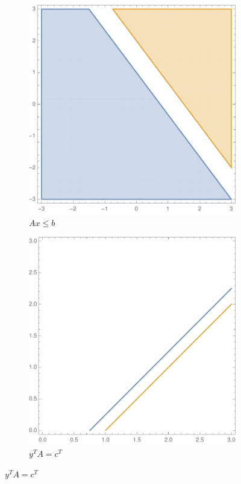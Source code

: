 \documentclass[10pt]{article}
\begin{document}
\begin{solution}
\begin{figure}[ht]\centering
    \begin{subfigure}{.4\textwidth}\centering
        \includegraphics[width=\textwidth]{img/Axb.pdf}
        \caption{ \( Ax\leq b \) }
        \label{Axb}
    \end{subfigure}
    \hspace{.15\textwidth}
    \begin{subfigure}{.4\textwidth}\centering
        \includegraphics[width=\textwidth]{img/yAc.pdf}
        \caption{ \( y^TA = c^T \) }
        \label{yAc}
    \end{subfigure}
\end{figure}

\pagebreak
\end{solution}
\end{document}
